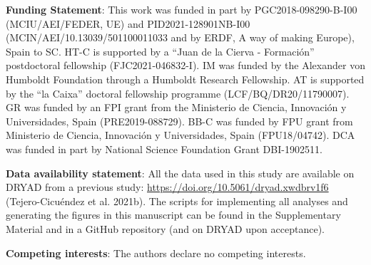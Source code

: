 \documentclass[
  11pt,
]{article}
\begin{document}
\textbf{Funding Statement}: This work was funded in part by
PGC2018-098290-B-I00 (MCIU/AEI/FEDER, UE) and PID2021-128901NB-I00
(MCIN/AEI/10.13039/501100011033 and by ERDF, A way of making Europe),
Spain to SC. HT-C is supported by a ``Juan de la Cierva - Formación''
postdoctoral fellowship (FJC2021-046832-I). IM was funded by the
Alexander von Humboldt Foundation through a Humboldt Research
Fellowship. AT is supported by the ``la Caixa'' doctoral fellowship
programme (LCF/BQ/DR20/11790007). GR was funded by an FPI grant from the
Ministerio de Ciencia, Innovación y Universidades, Spain
(PRE2019-088729). BB-C was funded by FPU grant from Ministerio de
Ciencia, Innovación y Universidades, Spain (FPU18/04742). DCA was funded
in part by National Science Foundation Grant DBI-1902511.

\textbf{Data availability statement}: All the data used in this study
are available on DRYAD from a previous study:
\url{https://doi.org/10.5061/dryad.xwdbrv1f6} (Tejero-Cicuéndez et al.
2021b). The scripts for implementing all analyses and generating the
figures in this manuscript can be found in the Supplementary Material
and in a GitHub repository (and on DRYAD upon acceptance).

\textbf{Competing interests}: The authors declare no competing
interests.

\newpage
\end{document}
